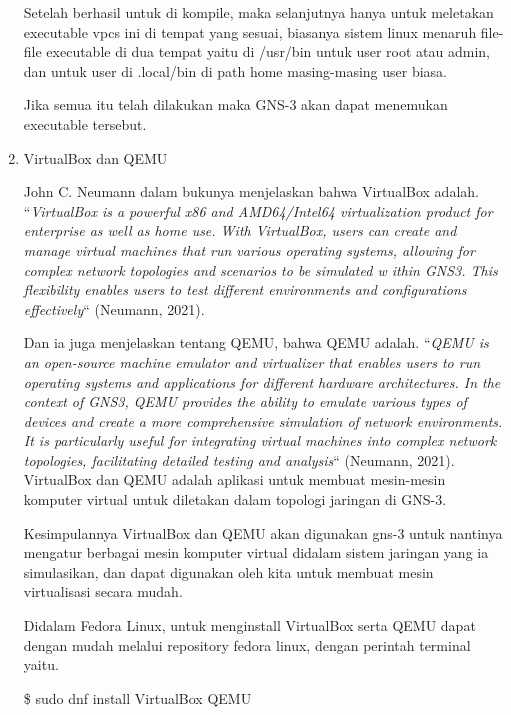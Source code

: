 \documentclass[12pt, a4paper]{article}
\begin{document}
\begin{enumerate}[label=\arabic*.]
          Setelah berhasil untuk di kompile, maka selanjutnya hanya untuk
          meletakan executable vpcs ini di tempat yang sesuai, biasanya
          sistem linux menaruh file-file executable di dua tempat yaitu
          di /usr/bin untuk user root atau admin, dan untuk user di
          .local/bin di path home masing-masing user biasa.

          Jika semua itu telah dilakukan maka GNS-3 akan dapat menemukan executable
          tersebut.

        \item VirtualBox dan QEMU

          John C. Neumann dalam bukunya menjelaskan bahwa VirtualBox adalah.
          ``\emph{VirtualBox is a powerful x86 and AMD64/Intel64 virtualization
          product for enterprise as well as home use. With VirtualBox,
          users can create and manage virtual machines that run various operating
          systems, allowing for complex network topologies and scenarios to be simulated w
          ithin GNS3. This flexibility enables users to test different
          environments and configurations effectively}`` (Neumann, 2021).

          Dan ia juga menjelaskan tentang QEMU, bahwa QEMU adalah.
          ``\emph{QEMU is an open-source machine emulator and virtualizer that enables
          users to run operating systems and applications for different hardware
          architectures. In the context of GNS3, QEMU provides the ability to emulate
          various types of devices and create a more comprehensive simulation of network
          environments. It is particularly useful for integrating virtual machines into
          complex network topologies, facilitating detailed testing and analysis}`` (Neumann, 2021).
          VirtualBox dan QEMU adalah aplikasi untuk membuat mesin-mesin komputer
          virtual untuk diletakan dalam topologi jaringan di GNS-3.

          Kesimpulannya VirtualBox dan QEMU akan digunakan gns-3 untuk
          nantinya mengatur berbagai mesin komputer virtual didalam
          sistem jaringan yang ia simulasikan, dan dapat digunakan
          oleh kita untuk membuat mesin virtualisasi secara mudah.

          Didalam Fedora Linux, untuk menginstall VirtualBox serta QEMU dapat dengan 
          mudah melalui repository fedora linux, dengan perintah terminal yaitu.

          \$ sudo dnf install VirtualBox QEMU

      \end{enumerate}
\end{document}
